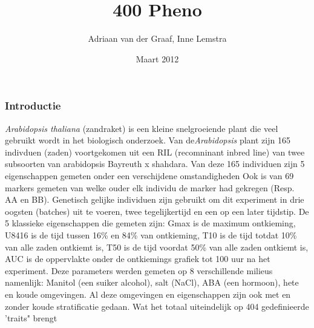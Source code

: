 \documentclass[12pt,a4paper]{article}
\author{Adriaan van der Graaf, Inne Lemstra}
\title{400 Pheno}
\date{Maart 2012}
\begin{document}
\maketitle



\subsubsection*{Introductie}
\textit{Arabidopsis thaliana} (zandraket) is een kleine snelgroeiende plant die veel gebruikt wordt in het biologisch onderzoek.
Van de\textit{Arabidopsis} plant zijn 165 indivduen (zaden) voortgekomen uit een RIL (recomninant inbred line) van twee subsoorten van arabidopsis Bayreuth x shahdara.
Van deze 165 individuen zijn 5 eigenschappen gemeten onder een verschijdene omstandigheden
Ook is van 69 markers  gemeten van welke ouder elk individu de marker had gekregen (Resp. AA en BB).
Genetisch gelijke individuen zijn gebruikt om dit experiment in drie oogsten (batches) uit te voeren, twee tegelijkertijd en een op een later tijdstip.
De 5 klassieke eigenschappen die gemeten zijn:
Gmax is de maximum ontkieming,
U8416 is de tijd tussen 16\% en 84\% van  ontkieming,
T10 is de tijd totdat 10\% van alle zaden ontkiemt is,
T50 is de tijd voordat 50\% van alle zaden ontkiemt is,
AUC is de oppervlakte onder de ontkiemings grafiek  tot 100 uur na het experiment.
Deze parameters werden gemeten op 8 verschillende milieus namenlijk:
Manitol (een suiker alcohol), salt (NaCl), ABA (een hormoon), hete en koude omgevingen.
Al deze omgevingen en eigenschappen zijn ook met en zonder koude stratificatie gedaan. 
Wat het totaal uiteindelijk op 404 gedefinieerde 'traits" brengt\\
\end{document}
